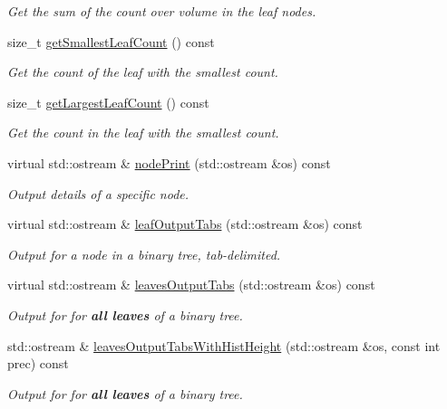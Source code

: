 \begin{DoxyCompactItemize}
\begin{DoxyCompactList}\small\item\em \-Get the sum of the count over volume in the leaf nodes. \end{DoxyCompactList}\item 
size\-\_\-t \hyperlink{classsubpavings_1_1SPSVnode_a5d355f8da3eb609f5c81ce63b437fcf9}{get\-Smallest\-Leaf\-Count} () const 
\begin{DoxyCompactList}\small\item\em \-Get the count of the leaf with the smallest count. \end{DoxyCompactList}\item 
size\-\_\-t \hyperlink{classsubpavings_1_1SPSVnode_adfb30c9946f868e143c81e6bf35a7a6f}{get\-Largest\-Leaf\-Count} () const 
\begin{DoxyCompactList}\small\item\em \-Get the count in the leaf with the smallest count. \end{DoxyCompactList}\item 
virtual std\-::ostream \& \hyperlink{classsubpavings_1_1SPSVnode_a51715ef7b6e370006e914fee15061cfc}{node\-Print} (std\-::ostream \&os) const 
\begin{DoxyCompactList}\small\item\em \-Output details of a specific node. \end{DoxyCompactList}\item 
virtual std\-::ostream \& \hyperlink{classsubpavings_1_1SPSVnode_a01b35db8ce4b99460ff352f6d25a529c}{leaf\-Output\-Tabs} (std\-::ostream \&os) const 
\begin{DoxyCompactList}\small\item\em \-Output for a node in a binary tree, tab-\/delimited. \end{DoxyCompactList}\item 
virtual std\-::ostream \& \hyperlink{classsubpavings_1_1SPSVnode_abcac815b9e5e60a3d18fa3534a12c518}{leaves\-Output\-Tabs} (std\-::ostream \&os) const 
\begin{DoxyCompactList}\small\item\em \-Output for for {\bfseries all leaves} of a binary tree. \end{DoxyCompactList}\item 
std\-::ostream \& \hyperlink{classsubpavings_1_1SPSVnode_adc55cda7856cfdd854051b891263d3bf}{leaves\-Output\-Tabs\-With\-Hist\-Height} (std\-::ostream \&os, const int prec) const 
\begin{DoxyCompactList}\small\item\em \-Output for for {\bfseries all leaves} of a binary tree. \end{DoxyCompactList}\item 

\end{DoxyCompactItemize}
